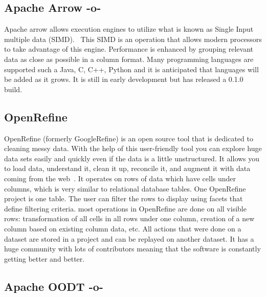 \subsection{Apache Arrow -o-}
     
Apache arrow allows execution engines to utilize what is known as
Single Input multiple data (SIMD).~\cite{www-arrow} This SIMD is an
operation that allows modern processors to take advantage of this
engine.  Performance is enhanced by grouping relevant data as close as
possible in a column format.  Many programming languages are supported
such a Java, C, C++, Python and it is anticipated that languages will
be added as it grows.  It is still in early development but has
released a 0.1.0 build.

\subsection{OpenRefine}

OpenRefine (formerly GoogleRefine) is an open source tool that is
dedicated to cleaning messy data. With the help of this user-friendly
tool you can explore huge data sets easily and quickly even if the
data is a little unstructured. It allows you to load data, understand
it, clean it up, reconcile it, and augment it with data coming from
the web~\cite{www-openrefine}. It operates on rows of data which have
cells under columns, which is very similar to relational database
tables. One OpenRefine project is one table. The user can filter the
rows to display using facets that define filtering criteria. most
operations in OpenRefine are done on all visible rows: transformation
of all cells in all rows under one column, creation of a new column
based on existing column data, etc. All actions that were done on a
dataset are stored in a project and can be replayed on another
dataset. It has a huge community with lots of contributors meaning
that the software is constantly getting better and better.

\subsection{Apache OODT -o-}

